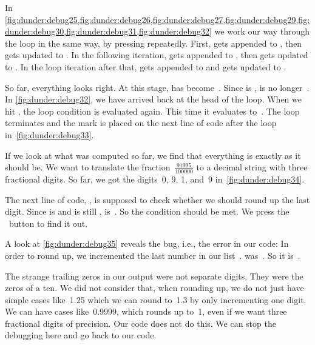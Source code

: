 In \cref{fig:dunder:debug25,fig:dunder:debug26,fig:dunder:debug27,fig:dunder:debug29,fig:dunder:debug30,fig:dunder:debug31,fig:dunder:debug32} we work our way through the loop in the same way, by pressing  repeatedly.
First,  gets appended to , then  gets updated to .
In the following iteration,  gets appended to , then  gets updated to .
In the loop iteration after that,  gets appended to  and  gets updated to .

So far, everything looks right.
At this stage,  has become~\pythonil{[0, 9, 1, 9]}.
Since  is ,  is no longer~.
In \cref{fig:dunder:debug32}, we have arrived back at the head of the loop.
When we hit , the loop condition is evaluated again.
This time it evaluates to~.
The loop terminates and the mark is placed on the next line of code after the loop in~\cref{fig:dunder:debug33}.

If we look at what was computed so far, we find that everything is exactly as it should be.
We want to translate the fraction~$\frac{91995}{100000}$ to a decimal string with three fractional digits.
So far, we got the digits~0, 9, 1, and~9 in~\cref{fig:dunder:debug34}.

The next line of code, , is supposed to check whether we should round up the last digit.
Since  is  and  is still ,  is~.
So the condition should be met.
We press the \pycharmDebuggerStepOver~button to find it out.

A look at \cref{fig:dunder:debug35} reveals the bug, i.e., the error in our code:
In order to round up, we incremented the last number in our list~.
 was~\pythonil{[0, 9, 1, 9]}.
So it is~\pythonil{[0, 9, 1, 10]}.

The strange trailing zeros in our output were not separate digits.
They were the zeros of a ten.
We did not consider that, when rounding up, we do not just have simple cases like~1.25 which we can round to~1.3 by only incrementing one digit.
We can have cases like~0.9999, which rounds up to~1, even if we want three fractional digits of precision.
Our code does not do this.
We can stop the debugging here and go back to our code.%
\clearpage%
%
%
%


